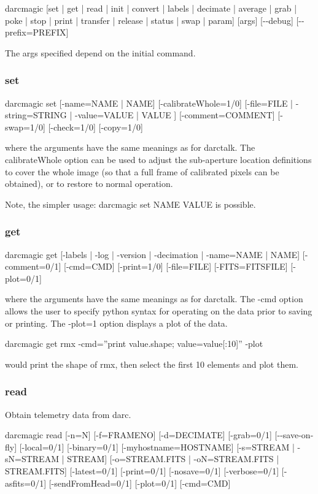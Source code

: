 \documentclass[a4,10pt]{article}
\begin{document}
darcmagic [set | get | read | init | convert | labels | decimate | average | grab | poke | stop | print | transfer | release | status | swap | param] [args] [-{-}debug] [-{-}prefix=PREFIX]

The args specified depend on the initial command.

\subsubsection{set}
darcmagic set [-name=NAME | NAME] [-calibrateWhole=1/0] [-file=FILE |
  -string=STRING | -value=VALUE | VALUE ] [-comment=COMMENT]
[-swap=1/0] [-check=1/0] [-copy=1/0] 

where the arguments have the same meanings as for darctalk.  The
calibrateWhole option can be used to adjust the sub-aperture location
definitions to cover the whole image (so that a full frame of
calibrated pixels can be obtained), or to restore to normal operation.

Note, the simpler usage: darcmagic set NAME VALUE is possible.

\subsubsection{get}
darcmagic get [-labels | -log | -version | -decimation | -name=NAME |
  NAME] [-comment=0/1] [-cmd=CMD] [-print=1/0] [-file=FILE]
[-FITS=FITSFILE] [-plot=0/1]

where the arguments have the same meanings as for darctalk.  The -cmd
option allows the user to specify python syntax for operating on the
data prior to saving or printing.  The -plot=1 option displays a plot
of the data.

darcmagic get rmx -cmd=''print value.shape; value=value[:10]'' -plot

would print the shape of rmx, then select the first 10 elements and
plot them.

\subsubsection{read}
Obtain telemetry data from darc.

darcmagic read [-n=N] [-f=FRAMENO] [-d=DECIMATE] [-grab=0/1] [-{-}save-on-fly]
[-local=0/1] [-binary=0/1] [-myhostname=HOSTNAME] [-s=STREAM |
  -sN=STREAM | STREAM] [-o=STREAM.FITS | -oN=STREAM.FITS |
  STREAM.FITS] [-latest=0/1] [-print=0/1] [-nosave=0/1] [-verbose=0/1]
[-asfits=0/1] [-sendFromHead=0/1] [-plot=0/1] [-cmd=CMD]
\end{document}

